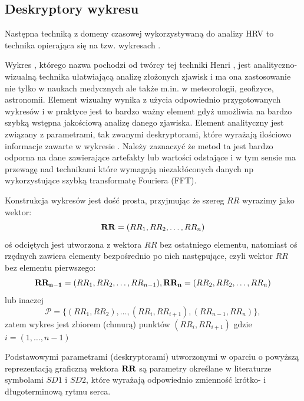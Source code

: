 \subsection{Deskryptory wykresu \PP{}}


Następna techniką z domeny czasowej wykorzystywaną do analizy HRV to technika opierająca
się na tzw. wykresach \PP{}.

Wykres \PP{}, którego nazwa pochodzi od twórcy tej techniki Henri \PP{}, jest 
analityczno-wizualną technika ułatwiającą analizę złożonych zjawisk i ma ona zastosowanie
nie tylko w naukach medycznych ale także m.in. w meteorologii, geofizyce, astronomii.
Element wizualny wynika z użycia odpowiednio przygotowanych wykresów i w praktyce jest to
bardzo ważny element gdyż umożliwia na bardzo szybką wstępna jakościową analizę danego
zjawiska. Element analityczny jest związany z parametrami, tak zwanymi deskryptorami,
które wyrażają ilościowo informacje zawarte w wykresie \PP{}. Należy zaznaczyć że
metod ta jest bardzo odporna na dane zawierające artefakty lub wartości odstające i w
tym sensie ma przewagę nad technikami które wymagają niezakłóconych danych np 
wykorzystujące szybką transformatę Fouriera (FFT).

Konstrukcja wykresów \PP{} jest dość prosta, przyjmując że szereg $RR$ wyrazimy jako
wektor:
\begin{equation}
\mathbf{RR} = (RR_{1}, RR_{2}, \ldots, RR_{n})
\end{equation}
oś odciętych jest utworzona z wektora $RR$ bez ostatniego elementu, natomiast oś rzędnych
zawiera elementy bezpośrednio po nich następujące, czyli wektor $RR$ bez elementu
pierwszego:
\begin{equation}
\mathbf{RR_{n-1}} = (RR_{1}, RR_{2}, \ldots, RR_{n-1}),
\mathbf{RR_n} = (RR_{2}, RR_{2}, \ldots, RR_{n}) 
\end{equation}
lub inaczej
\begin{equation}
  \mathcal{P} = \{(RR_1, RR_2),\ldots, (RR_i, RR_{i+1}), (RR_{n-1}, RR_n )\},
 \label{eq:p_plot}
\end{equation}
zatem wykres \PP{} jest zbiorem (chmurą) punktów $(RR_{i}, RR_{i+1})$ gdzie $i=(1, \ldots, n-1)$

Podstawowymi parametrami (deskryptorami) utworzonymi w oparciu o powyższą reprezentacją 
graficzną wektora $\mathbf{RR}$ są parametry określane w literaturze symbolami $SD1$ i $SD2$, które
wyrażają odpowiednio zmienność krótko- i długoterminową rytmu serca.


